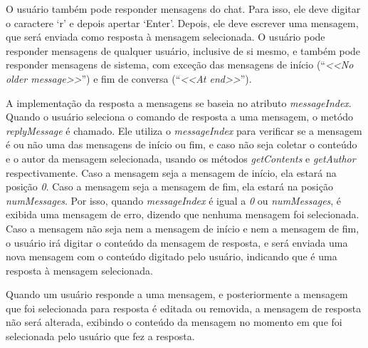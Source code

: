 \documentclass[../main.tex]{subfiles}
\begin{document}
O usuário também pode responder mensagens do chat.
Para isso, ele deve digitar o caractere `r' e depois apertar `Enter'.
Depois, ele deve escrever uma mensagem, que será enviada como resposta à mensagem selecionada.
O usuário pode responder mensagens de qualquer usuário, inclusive de si mesmo, e também pode responder mensagens de sistema, com exceção das mensagens de início (``\textit{<<No older message>>}'') e fim de conversa (``\textit{<<At end>>}'').

A implementação da resposta a mensagens se baseia no atributo \textit{messageIndex}.
Quando o usuário seleciona o comando de resposta a uma mensagem, o metódo \textit{replyMessage} é chamado.
Ele utiliza o \textit{messageIndex} para verificar se a mensagem é ou não uma das mensagens de início ou fim, e caso não seja coletar o conteúdo e o autor da mensagem selecionada, usando os métodos \textit{getContents} e \textit{getAuthor} respectivamente. Caso a mensagem seja a mensagem de início, ela estará na posição \textit{0}. Caso a mensagem seja a mensagem de fim, ela estará na posição \textit{numMessages}. Por isso, quando \textit{messageIndex} é igual a \textit{0} ou \textit{numMessages}, é exibida uma mensagem de erro, dizendo que nenhuma mensagem foi selecionada. Caso a mensagem não seja nem a mensagem de início e nem a mensagem de fim, o usuário irá digitar o conteúdo da mensagem de resposta, e será enviada uma nova mensagem com o conteúdo digitado pelo usuário, indicando que é uma resposta à mensagem selecionada.

Quando um usuário responde a uma mensagem, e posteriormente a mensagem que foi selecionada para resposta é editada ou removida, a mensagem de resposta não será alterada, exibindo o conteúdo da mensagem no momento em que foi selecionada pelo usuário que fez a resposta.
\end{document}
